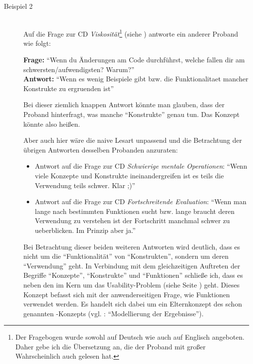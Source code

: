\begin{description}
\begin{description}
    \item[Beispiel 2] \hfill \\
    Auf die Frage zur CD \textit{Viskosität}\footnote{Der Fragebogen wurde sowohl auf Deutsch wie auch auf Englisch angeboten. Daher gebe ich die Übersetzung an, die der Proband mit großer Wahrscheinlich auch gelesen hat.} (siehe ) antworte ein anderer Proband wie folgt:
  
    \textbf{Frage:} ``Wenn du Änderungen am Code durchführst, welche fallen dir am schwersten/aufwendigsten? Warum?''\\
    \textbf{Antwort:} ``Wenn es wenig Beispiele gibt bzw. die Funktionalitaet mancher Konstrukte zu ergruenden ist''
    
    Bei dieser ziemlich knappen Antwort könnte man glauben, dass der Proband hinterfragt, was manche ``Konstrukte'' genau tun. Das Konzept könnte also  heißen.
    
    Aber auch hier wäre die naive Lesart unpassend und die Betrachtung der übrigen Antworten desselben Probanden anzuraten:
    \begin{itemize}
      \item Antwort auf die Frage zur CD \textit{Schwierige mentale Operationen}: ``Wenn viele Konzepte und Konstrukte ineinandergreifen ist es teils die Verwendung teils schwer. Klar ;)''
      \item Antwort auf die Frage zur CD \textit{Fortschreitende Evaluation}: ``Wenn man lange nach bestimmten Funktionen sucht bzw. lange braucht deren Verwendung zu verstehen ist der Fortschritt manchmal schwer zu ueberblicken. Im Prinzip aber ja.'' 
    \end{itemize}
    
    Bei Betrachtung dieser beiden weiteren Antworten wird deutlich, dass es nicht um die ``Funktionalität'' von ``Konstrukten'', sondern um deren ``Verwendung'' geht. In Verbindung mit dem gleichzeitigen Auftreten der Begriffe ``Konzepte'', ``Konstrukte'' und ``Funktionen'' schließe ich, dass es neben den  im Kern um das Usability-Problem  (siehe Seite \pageref{sec:typing}) geht. Dieses Konzept befasst sich mit der anwenderseitigen Frage, wie Funktionen verwendet werden. Es handelt sich dabei um ein Elternkonzept des schon genannten -Konzepts (vgl. : ``Modellierung der Ergebnisse'').


\end{description}
\end{description}
